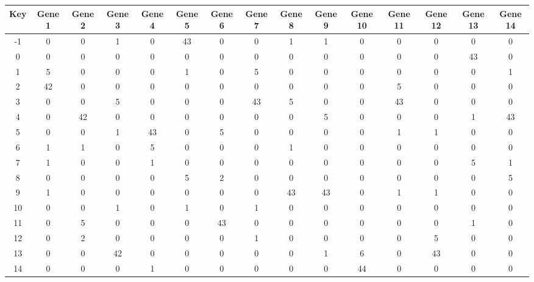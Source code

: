 \begin{tabular}{|c|c|c|c|c|c|c|c|c|c|c|c|c|c|c|}
\hline
Key & Gene 1 & Gene 2 & Gene 3 & Gene 4 & Gene 5 & Gene 6 & Gene 7 & Gene 8 & Gene 9 & Gene 10 & Gene 11 & Gene 12 & Gene 13 & Gene 14 \\
\hline
-1 & 0 & 0 & 1 & 0 & 43 & 0 & 0 & 1 & 1 & 0 & 0 & 0 & 0 & 0 \\
0 & 0 & 0 & 0 & 0 & 0 & 0 & 0 & 0 & 0 & 0 & 0 & 0 & 43 & 0 \\
1 & 5 & 0 & 0 & 0 & 1 & 0 & 5 & 0 & 0 & 0 & 0 & 0 & 0 & 1 \\
2 & 42 & 0 & 0 & 0 & 0 & 0 & 0 & 0 & 0 & 0 & 5 & 0 & 0 & 0 \\
3 & 0 & 0 & 5 & 0 & 0 & 0 & 43 & 5 & 0 & 0 & 43 & 0 & 0 & 0 \\
4 & 0 & 42 & 0 & 0 & 0 & 0 & 0 & 0 & 5 & 0 & 0 & 0 & 1 & 43 \\
5 & 0 & 0 & 1 & 43 & 0 & 5 & 0 & 0 & 0 & 0 & 1 & 1 & 0 & 0 \\
6 & 1 & 1 & 0 & 5 & 0 & 0 & 0 & 1 & 0 & 0 & 0 & 0 & 0 & 0 \\
7 & 1 & 0 & 0 & 1 & 0 & 0 & 0 & 0 & 0 & 0 & 0 & 0 & 5 & 1 \\
8 & 0 & 0 & 0 & 0 & 5 & 2 & 0 & 0 & 0 & 0 & 0 & 0 & 0 & 5 \\
9 & 1 & 0 & 0 & 0 & 0 & 0 & 0 & 43 & 43 & 0 & 1 & 1 & 0 & 0 \\
10 & 0 & 0 & 1 & 0 & 1 & 0 & 1 & 0 & 0 & 0 & 0 & 0 & 0 & 0 \\
11 & 0 & 5 & 0 & 0 & 0 & 43 & 0 & 0 & 0 & 0 & 0 & 0 & 1 & 0 \\
12 & 0 & 2 & 0 & 0 & 0 & 0 & 1 & 0 & 0 & 0 & 0 & 5 & 0 & 0 \\
13 & 0 & 0 & 42 & 0 & 0 & 0 & 0 & 0 & 1 & 6 & 0 & 43 & 0 & 0 \\
14 & 0 & 0 & 0 & 1 & 0 & 0 & 0 & 0 & 0 & 44 & 0 & 0 & 0 & 0 \\
\hline
\end{tabular}